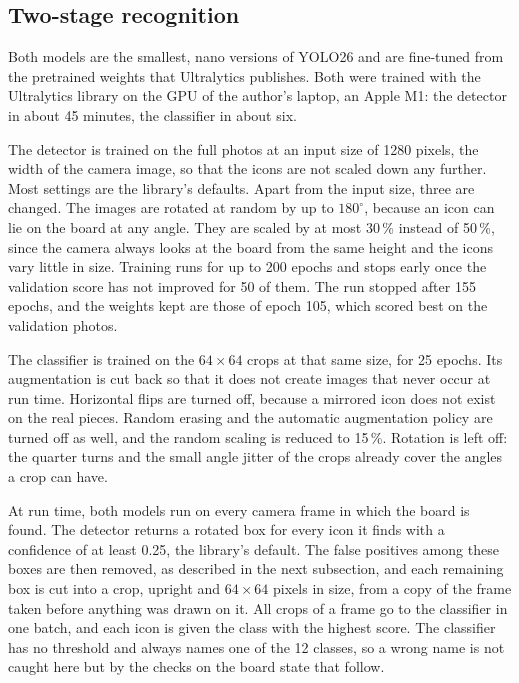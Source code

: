 \subsection{Two-stage recognition}
\label{subsec:two-stage-recognition}

Both models are the smallest, nano versions of YOLO26 and are fine-tuned from the pretrained weights that Ultralytics publishes.
Both were trained with the Ultralytics library \cite{ultralytics} on the \ac{GPU} of the author's laptop, an Apple M1: the detector in about 45 minutes, the classifier in about six.

The detector is trained on the full photos at an input size of 1280 pixels, the width of the camera image, so that the icons are not scaled down any further.
Most settings are the library's defaults.
Apart from the input size, three are changed.
The images are rotated at random by up to $180^\circ$, because an icon can lie on the board at any angle.
They are scaled by at most 30\,\% instead of 50\,\%, since the camera always looks at the board from the same height and the icons vary little in size.
Training runs for up to 200 epochs and stops early once the validation score has not improved for 50 of them.
The run stopped after 155 epochs, and the weights kept are those of epoch 105, which scored best on the validation photos.

The classifier is trained on the $64 \times 64$ crops at that same size, for 25 epochs.
Its augmentation is cut back so that it does not create images that never occur at run time.
Horizontal flips are turned off, because a mirrored icon does not exist on the real pieces.
Random erasing and the automatic augmentation policy are turned off as well, and the random scaling is reduced to 15\,\%.
Rotation is left off: the quarter turns and the small angle jitter of the crops already cover the angles a crop can have.

At run time, both models run on every camera frame in which the board is found.
The detector returns a rotated box for every icon it finds with a confidence of at least 0.25, the library's default.
The false positives among these boxes are then removed, as described in the next subsection, and each remaining box is cut into a crop, upright and $64 \times 64$ pixels in size, from a copy of the frame taken before anything was drawn on it.
All crops of a frame go to the classifier in one batch, and each icon is given the class with the highest score.
The classifier has no threshold and always names one of the 12 classes, so a wrong name is not caught here but by the checks on the board state that follow.

